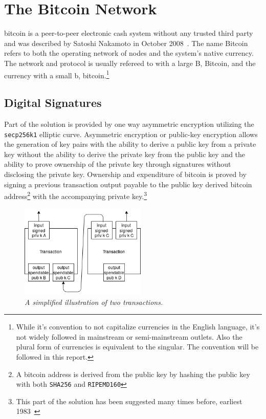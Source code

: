 \chapter{The Bitcoin Network}
	\label{sec:bitcoin}

\gls{bitcoin} is a peer-to-peer electronic cash system without any trusted third party and was described by Satoshi Nakamoto in October 2008~\cite{nakamoto:bitcoin}. The name Bitcoin refers to both the operating network of \gls{node}s and the system's native currency. The network and protocol is usually refereed to with a large B, Bitcoin, and the currency with a small b, bitcoin.\footnote{While it's convention to not capitalize currencies in the English language, it's not widely followed in mainstream or semi-mainstream outlets. Also the plural form of currencies is equivalent to the singular. The convention will be followed in this report.}

\section{Digital Signatures}

Part of the solution is provided by one way asymmetric encryption utilizing the \texttt{secp256k1} elliptic curve. Asymmetric encryption or public-key encryption allows the generation of key pairs with the ability to derive a public key from a private key without the ability to derive the private key from the public key and the ability to prove ownership of the private key through signatures without disclosing the private key. Ownership and expenditure of bitcoin is proved by signing a previous transaction output payable to the public key derived bitcoin address\footnote{A bitcoin address is derived from the public key by \gls{hash}ing the public key with both \texttt{SHA256} and \texttt{RIPEMD160}} with the accompanying private key.\footnote{This part of the solution has been suggested many times before, earliest 1983~\cite{chaum:blind:signatures}}

\begin{figure}[!htb]

	\centering
	\includegraphics[width=6cm]{images/transaction.png}
	\caption{\textit{A simplified illustration of two transactions. 
	}}
	\label{fig:two:tx}

\end{figure}

